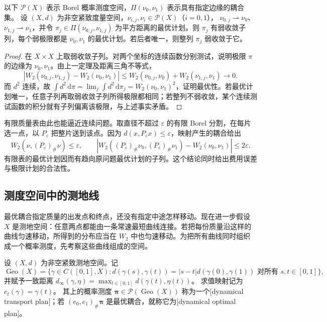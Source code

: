 \begin{proposition}\label{g3:prop:C-optimal-plan-stability}
	以下 \(\mathcal P(X)\) 表示 Borel 概率测度空间，\(\Pi(\nu_0,\nu_1)\) 表示具有指定边缘的耦合集。
	设 \((X,d)\) 为非空紧致度量空间，\(\nu_{i,j},\nu_i\in\mathcal P(X)\)（\(i=0,1\)），
	\(\nu_{0,j}\rightharpoonup\nu_0\)、\(\nu_{1,j}\rightharpoonup\nu_1\)，并令
	\(\pi_j\in\Pi(\nu_{0,j},\nu_{1,j})\) 为平方距离的最优计划。则 \(\pi_j\) 有弱收敛子列，每个弱极限都是 \(\nu_0,\nu_1\) 的最优计划。若后者唯一，则整列 \(\pi_j\) 弱收敛于它。
\end{proposition}
\begin{proof}
	在 \(X\times X\) 上取弱收敛子列。对两个坐标的连续函数分别测试，说明极限 \(\pi\) 的边缘为 \(\nu_0,\nu_1\)。由上一定理及距离三角不等式，
	\[
		|W_2(\nu_{0,j},\nu_{1,j})-W_2(\nu_0,\nu_1)|
		\le W_2(\nu_{0,j},\nu_0)+W_2(\nu_{1,j},\nu_1)\longrightarrow0.
	\]
	而 \(d^2\) 连续，故
	\(\int d^2\,\mathrm d\pi=\lim_j\int d^2\,\mathrm d\pi_j
	=W_2(\nu_0,\nu_1)^2\)，证明最优性。若最优计划唯一，任意子列再取弱收敛子列所得极限都相同；若整列不弱收敛，某个连续测试函数的积分就有子列偏离该极限，与上述事实矛盾。
\end{proof}

有限质量表由此也能逼近连续问题。取直径不超过 \(\varepsilon\) 的有限 Borel 分割，在每片选一点，以 \(P_\varepsilon\) 把整片送到该点。因为
\(d(x,P_\varepsilon x)\le\varepsilon\)，映射产生的耦合给出
\[
	W_2(\nu,(P_\varepsilon)_\#\nu)\le\varepsilon,\qquad
	\left|W_2((P_\varepsilon)_\#\nu_0,(P_\varepsilon)_\#\nu_1)
	          -W_2(\nu_0,\nu_1)\right|\le2\varepsilon.
\]
有限表的最优计划因而有趋向原问题最优计划的子列。这个结论同时给出费用误差与极限计划的合法性。

\subsection{测度空间中的测地线}
\label{g3:subsec:C01:03}

最优耦合指定质量的出发点和终点，还没有指定中途怎样移动。现在进一步假设 \(X\) 是测地空间：任意两点都能由一条常速最短曲线连接。若把每份质量沿这样的曲线匀速移动，所得到的分布应当在 \(W_2\) 中也匀速移动。为把所有曲线同时组织成一个概率测度，先考察这些曲线组成的空间。

\begin{definition}\label{g3:def:C-dynamical-plan}
	设 \((X,d)\) 为非空紧致测地空间。记
	\[
		\operatorname{Geo}(X)=
		\{\gamma\in C([0,1],X):
		  d(\gamma(s),\gamma(t))
		  =|s-t|d(\gamma(0),\gamma(1))\text{ 对所有 }s,t\in[0,1]\},
	\]
	并赋予一致距离
	\(d_\infty(\gamma,\eta)=\max_{t\in[0,1]}d(\gamma(t),\eta(t))\)。
	求值映射记为 \(e_t(\gamma)=\gamma(t)\)。
	其上的概率测度 \(\boldsymbol\pi\in\mathcal P(\operatorname{Geo}(X))\) 称为一个[dynamical transport plan]；若
	\((e_0,e_1)_\#\boldsymbol\pi\) 是最优耦合，就称它为[dynamical optimal plan]。
\end{definition}


